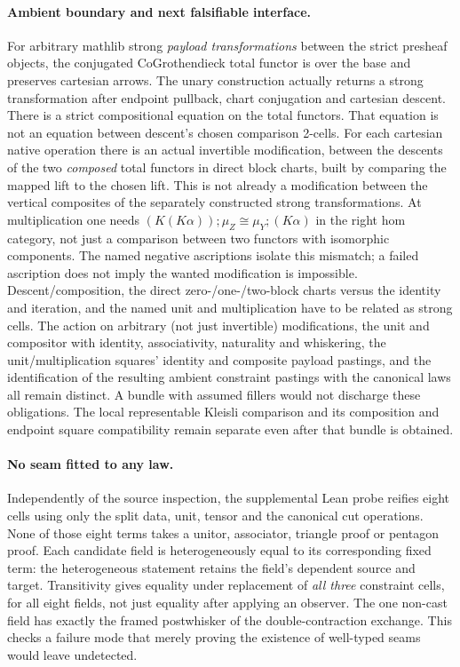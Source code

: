 \documentclass[11pt]{article}
\begin{document}
\paragraph{Ambient boundary and next falsifiable interface.}
For arbitrary mathlib strong \emph{payload transformations} between the
strict presheaf objects, the conjugated CoGrothendieck total functor is
over the base and preserves cartesian arrows. The unary construction
actually returns a strong transformation after endpoint pullback, chart
conjugation and cartesian descent. There is a strict compositional
equation on the total functors. That equation is not an equation between
descent's chosen comparison 2-cells. For each cartesian native operation
there is an actual invertible modification, between the descents of the
two \emph{composed} total functors in direct block charts, built by comparing
the mapped lift to the chosen lift. This is not already a modification
between the vertical composites of the separately constructed strong
transformations. At multiplication one needs
$(K(K\alpha));\mu_Z\cong\mu_Y;(K\alpha)$ in the right hom category,
not just a comparison between two functors with isomorphic components.
The named negative ascriptions isolate this mismatch; a failed ascription
does not imply the wanted modification is impossible.
Descent/composition, the direct zero-/one-/two-block charts versus the
identity and iteration, and the named unit and multiplication have to be
related as strong cells. The action on arbitrary (not just invertible)
modifications, the unit and compositor with identity, associativity,
naturality and whiskering, the unit/multiplication squares' identity and
composite payload pastings, and the identification of the resulting
ambient constraint pastings with the canonical laws all remain distinct.
A bundle with assumed fillers would not discharge these obligations.
The local representable Kleisli comparison and its composition and endpoint
square compatibility remain separate even after that bundle is obtained.
\paragraph{No seam fitted to any law.}
Independently of the source inspection, the supplemental Lean probe
reifies eight cells using only the split data, unit, tensor and the
canonical cut operations. None of those eight terms takes a unitor,
associator, triangle proof or pentagon proof. Each candidate field is
heterogeneously equal to its corresponding fixed term: the heterogeneous
statement retains the field's dependent source and target. Transitivity
gives equality under replacement of \emph{all three} constraint cells,
for all eight fields, not just equality after applying an observer.
The one non-cast field has exactly the framed postwhisker of the
double-contraction exchange. This checks a failure mode that merely
proving the existence of well-typed seams would leave undetected.
\end{document}
